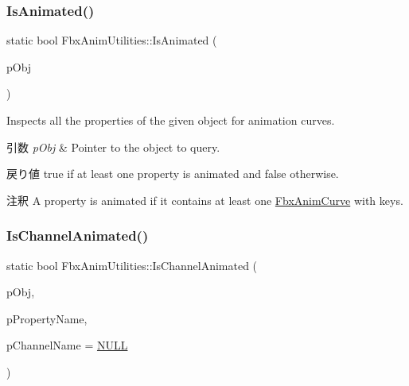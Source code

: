 \mbox{\label{class_fbx_anim_utilities_aded021028322b991d38cb1683455a1c2}} 
\subsubsection{\texorpdfstring{Is\+Animated()}{IsAnimated()}}
{\footnotesize\ttfamily static bool Fbx\+Anim\+Utilities\+::\+Is\+Animated (\begin{DoxyParamCaption}\item[{\hyperlink{class_fbx_object}{Fbx\+Object} $\ast$}]{p\+Obj }\end{DoxyParamCaption})\hspace{0.3cm}{\ttfamily [static]}}

Inspects all the properties of the given object for animation curves. 
\begin{DoxyParams}{引数}
{\em p\+Obj} & Pointer to the object to query. \\
\hline
\end{DoxyParams}
\begin{DoxyReturn}{戻り値}
{\ttfamily true} if at least one property is animated and {\ttfamily false} otherwise. 
\end{DoxyReturn}
\begin{DoxyRemark}{注釈}
A property is animated if it contains at least one \hyperlink{class_fbx_anim_curve}{Fbx\+Anim\+Curve} with keys. 
\end{DoxyRemark}
\mbox{\label{class_fbx_anim_utilities_a9748f17b14f4ad8cc0480d36bcaaed37}} 
\subsubsection{\texorpdfstring{Is\+Channel\+Animated()}{IsChannelAnimated()}}
{\footnotesize\ttfamily static bool Fbx\+Anim\+Utilities\+::\+Is\+Channel\+Animated (\begin{DoxyParamCaption}\item[{\hyperlink{class_fbx_object}{Fbx\+Object} $\ast$}]{p\+Obj,  }\item[{const char $\ast$}]{p\+Property\+Name,  }\item[{const char $\ast$}]{p\+Channel\+Name = {\ttfamily \hyperlink{fbxarch_8h_a070d2ce7b6bb7e5c05602aa8c308d0c4}{N\+U\+LL}} }\end{DoxyParamCaption})\hspace{0.3cm}{\ttfamily [static]}}

